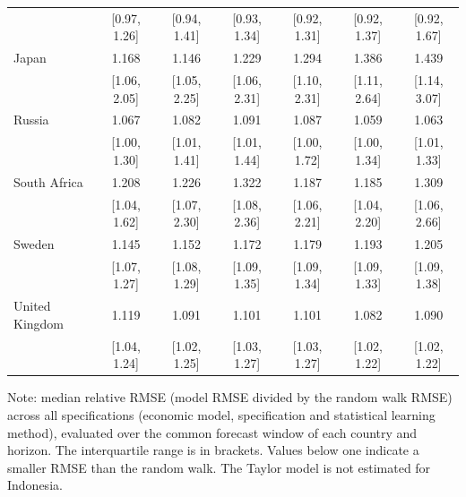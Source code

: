 \begin{table}[htbp]
{\begin{tabular*}{\textwidth}{@{\extracolsep{\fill}}lcccccc}
 & [0.97, 1.26] & [0.94, 1.41] & [0.93, 1.34] & [0.92, 1.31] & [0.92, 1.37] & [0.92, 1.67] \\
\addlinespace
Japan & 1.168 & 1.146 & 1.229 & 1.294 & 1.386 & 1.439 \\
 & [1.06, 2.05] & [1.05, 2.25] & [1.06, 2.31] & [1.10, 2.31] & [1.11, 2.64] & [1.14, 3.07] \\
\addlinespace
Russia & 1.067 & 1.082 & 1.091 & 1.087 & 1.059 & 1.063 \\
 & [1.00, 1.30] & [1.01, 1.41] & [1.01, 1.44] & [1.00, 1.72] & [1.00, 1.34] & [1.01, 1.33] \\
\addlinespace
South Africa & 1.208 & 1.226 & 1.322 & 1.187 & 1.185 & 1.309 \\
 & [1.04, 1.62] & [1.07, 2.30] & [1.08, 2.36] & [1.06, 2.21] & [1.04, 2.20] & [1.06, 2.66] \\
\addlinespace
Sweden & 1.145 & 1.152 & 1.172 & 1.179 & 1.193 & 1.205 \\
 & [1.07, 1.27] & [1.08, 1.29] & [1.09, 1.35] & [1.09, 1.34] & [1.09, 1.33] & [1.09, 1.38] \\
\addlinespace
United Kingdom & 1.119 & 1.091 & 1.101 & 1.101 & 1.082 & 1.090 \\
 & [1.04, 1.24] & [1.02, 1.25] & [1.03, 1.27] & [1.03, 1.27] & [1.02, 1.22] & [1.02, 1.22] \\
\bottomrule
\end{tabular*}
}
\par\noindent\begin{minipage}{\textwidth}
{\fontsize{8}{10}\selectfont Note: median relative RMSE (model RMSE divided by the random walk RMSE) across all specifications (economic model, specification and statistical learning method), evaluated over the common forecast window of each country and horizon. The interquartile range is in brackets. Values below one indicate a smaller RMSE than the random walk. The Taylor model is not estimated for Indonesia.}
\end{minipage}
\end{table}
